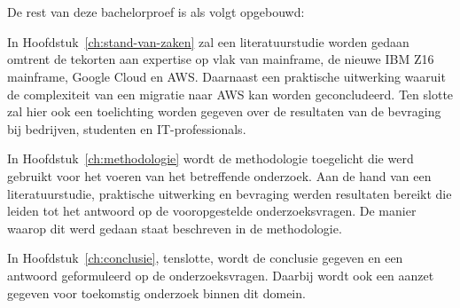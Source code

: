 \newpage

\section{}
\label{sec:opzet-bachelorproef}


De rest van deze bachelorproef is als volgt opgebouwd:

In Hoofdstuk~\ref{ch:stand-van-zaken} zal een literatuurstudie worden gedaan omtrent de tekorten aan expertise op vlak van mainframe, de nieuwe IBM Z16 mainframe, Google Cloud en AWS. Daarnaast een praktische uitwerking waaruit de complexiteit van een migratie naar AWS kan worden geconcludeerd. Ten slotte zal hier ook een toelichting worden gegeven over de resultaten van de bevraging bij bedrijven, studenten en IT-professionals. 

In Hoofdstuk~\ref{ch:methodologie} wordt de methodologie toegelicht die werd gebruikt voor het voeren van het betreffende onderzoek. Aan de hand van een literatuurstudie, praktische uitwerking en bevraging werden resultaten bereikt die leiden tot het antwoord op de vooropgestelde onderzoeksvragen. De manier waarop dit werd gedaan staat beschreven in de methodologie.


In Hoofdstuk~\ref{ch:conclusie}, tenslotte, wordt de conclusie gegeven en een antwoord geformuleerd op de onderzoeksvragen. Daarbij wordt ook een aanzet gegeven voor toekomstig onderzoek binnen dit domein.
